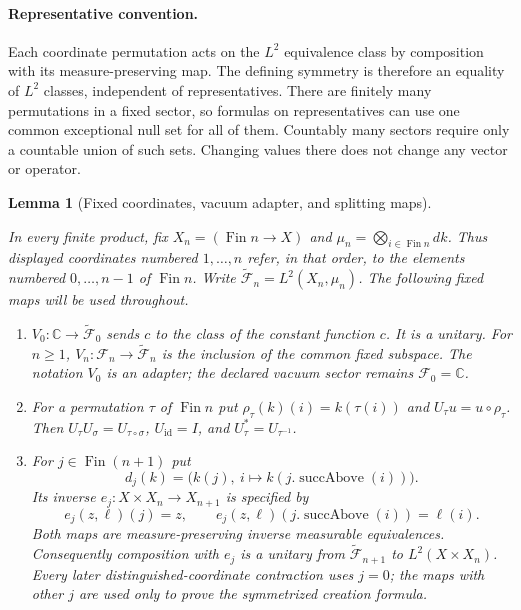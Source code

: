 \documentclass[11pt,a4paper]{article}
\newtheorem{lemma}[theorem]{Lemma}
\theoremstyle{definition}
\theoremstyle{remark}
\newcommand{\proofid}[1]{\par\smallskip{\normalfont\scriptsize\color{inkblue}Stable ID: \nolinkurl{#1}}\par\smallskip}
\begin{document}
\paragraph{Representative convention.}
Each coordinate permutation acts on the $L^2$ equivalence class by
composition with its measure-preserving map. The defining symmetry is
therefore an equality of $L^2$ classes, independent of representatives.
There are finitely many permutations in a fixed sector, so formulas on
representatives can use one common exceptional null set for all of
them. Countably many sectors require only a countable union of such
sets. Changing values there does not change any vector or operator.

\begin{lemma}[Fixed coordinates, vacuum adapter, and splitting maps]
\label{fock:coordinate-model}
\proofid{fock:coordinate-model}
\par{}\par\smallskip

In every finite product, fix
$X_n=(\operatorname{Fin}n\to X)$ and
$\mu_n=\bigotimes_{i\in\operatorname{Fin}n}dk$.
Thus displayed coordinates numbered $1,\ldots,n$ refer, in that
order, to the elements numbered $0,\ldots,n-1$ of
$\operatorname{Fin}n$. Write $\widetilde{\mathcal F}_n=L^2(X_n,\mu_n)$.
The following fixed maps will be used throughout.
\begin{enumerate}
\item $V_0:\mathbb C\to\widetilde{\mathcal F}_0$ sends $c$ to the
class of the constant function $c$. It is a unitary. For $n\geq1$,
$V_n:\mathcal F_n\to\widetilde{\mathcal F}_n$ is the inclusion of
the common fixed subspace. The notation $V_0$ is an adapter; the
declared vacuum sector remains $\mathcal F_0=\mathbb C$.
\item For a permutation $\tau$ of $\operatorname{Fin}n$ put
$\rho_\tau(k)(i)=k(\tau(i))$ and
$U_\tau u=u\circ\rho_\tau$. Then
$U_\tau U_\sigma=U_{\tau\circ\sigma}$,
$U_{\mathrm{id}}=I$, and $U_\tau^*=U_{\tau^{-1}}$.
\item For $j\in\operatorname{Fin}(n+1)$ put
\[
 d_j(k)=\big(k(j),\ i\mapsto k(j.\operatorname{succAbove}(i))\big).
\]
Its inverse $e_j:X\times X_n\to X_{n+1}$ is specified by
\[
 e_j(z,\ell)(j)=z,\qquad
 e_j(z,\ell)(j.\operatorname{succAbove}(i))=\ell(i).
\]
Both maps are measure-preserving inverse measurable equivalences.
Consequently composition with $e_j$ is a unitary from
$\widetilde{\mathcal F}_{n+1}$ to $L^2(X\times X_n)$.
Every later distinguished-coordinate contraction uses $j=0$;
the maps with other $j$ are used only to prove the symmetrized
creation formula.
\end{enumerate}
\end{lemma}
\end{document}
